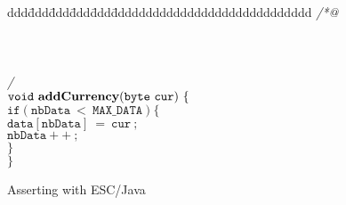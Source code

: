 \documentclass[a4paper]{llncs}
\begin{document}
\begin{figure}[hbt]
\begin{tabbing}
ddd\=ddd\=ddd\=ddd\=ddd\=ddddddddddddddddddddddddddddd \kill
{\it /*@ } \\
 \\
 \\
 \\
{\it */ } \\
$\mathtt{void\ {\bf addCurrency}(byte\ cur)\ \{}$ \\
\>$\mathtt{if(nbData\ <\ MAX\_DATA) \{}$ \\
\>\>$\mathtt{data[nbData]\ =\ cur\ ;}$ \\
\>\>$\mathtt{nbData++\ ;}$ \\
\>$\mathtt{\}}$ \\
$\mathtt{\}}$ 
\end{tabbing}
\caption{Asserting with ESC/Java}
\label{fig-add-cur}
\end{figure}
\end{document}
